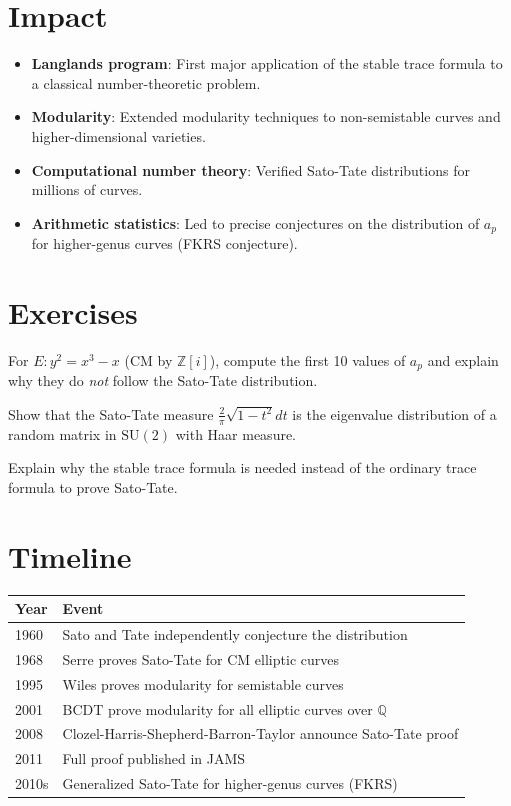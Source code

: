 \section{Impact}
\begin{itemize}
\item \textbf{Langlands program}: First major application of the stable trace formula to a classical number-theoretic problem.
\item \textbf{Modularity}: Extended modularity techniques to non-semistable curves and higher-dimensional varieties.
\item \textbf{Computational number theory}: Verified Sato-Tate distributions for millions of curves.
\item \textbf{Arithmetic statistics}: Led to precise conjectures on the distribution of $a_p$ for higher-genus curves (FKRS conjecture).
\end{itemize}

\section{Exercises}

\begin{exercise}[Basic]
For $E: y^2 = x^3 - x$ (CM by $\mathbb{Z}[i]$), compute the first 10 values of $a_p$ and explain why they do \emph{not} follow the Sato-Tate distribution.
\end{exercise}

\begin{exercise}[Intermediate]
Show that the Sato-Tate measure $\frac{2}{\pi}\sqrt{1-t^2} dt$ is the eigenvalue distribution of a random matrix in $\text{SU}(2)$ with Haar measure.
\end{exercise}

\begin{exercise}[Challenge]
Explain why the stable trace formula is needed instead of the ordinary trace formula to prove Sato-Tate.
\end{exercise}

\section{Timeline}

\begin{tabularx}{\linewidth}{lX}
\toprule
\textbf{Year} & \textbf{Event} \\ \midrule
1960 & Sato and Tate independently conjecture the distribution \\ 
1968 & Serre proves Sato-Tate for CM elliptic curves \\ 
1995 & Wiles proves modularity for semistable curves \\ 
2001 & BCDT prove modularity for all elliptic curves over $\mathbb{Q}$ \\ 
2008 & Clozel-Harris-Shepherd-Barron-Taylor announce Sato-Tate proof \\ 
2011 & Full proof published in JAMS \\ 
2010s & Generalized Sato-Tate for higher-genus curves (FKRS) \\ \bottomrule
\end{tabularx}

